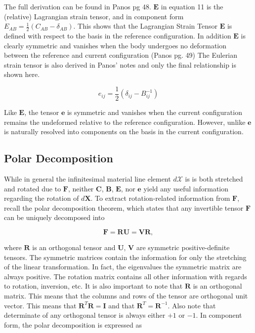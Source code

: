 \documentclass[a4paper]{article}
\begin{document}
The full derivation can be found in Panos pg 48. $\mathbf{E}$ in equation 11 is the (relative) Lagrangian strain tensor, and in component form $E_{AB} = \frac{1}{2} (C_{AB} - \delta_{AB})$. This shows that the Lagrangian Strain Tensor $\mathbf{E}$ is defined with respect to the basis in the reference configuration. In addition $\mathbf{E}$ is clearly symmetric and vanishes when the body undergoes no deformation between the reference and current configuration (Panos pg. 49) 
The Eulerian strain tensor is also derived in Panos' notes and only the final relationship is shown here. 

\begin{equation}
    e_{ij} = \frac{1}{2} (\delta_{ij} - B^{-1}_{ij})
\end{equation}

Like $\mathbf{E}$, the tensor $\mathbf{e}$ is symmetric and vanishes when the current configuration remains the undeformed relative to the reference configuration. However, unlike $\mathbf{e}$ is naturally resolved into components on the basis in the current configuration. 

\subsection{Polar Decomposition}

While in general the infinitesimal material line element $d\mathcal{X}$ is is both stretched and rotated due to $\mathbf{F}$, neither $\mathbf{C}$, $\mathbf{B}$, $\mathbf{E}$, nor $\mathbf{e}$ yield any useful information regarding the rotation of $d\mathbf{X}$. To extract rotation-related information from $\mathbf{F}$, recall the polar decomposition theorem, which states that any invertible tensor $\mathbf{F}$ can be uniquely decomposed into 

\begin{equation}\label{eqn 27}
    \mathbf{F} = \mathbf{R} \mathbf{U} = \mathbf{V} \mathbf{R}, 
\end{equation}

where $\mathbf{R}$ is an orthogonal tensor and $\mathbf{U}$, $\mathbf{V}$ are symmetric positive-definite tensors. The symmetric matrices contain the information for only the stretching of the linear transformation. In fact, the eigenvalues the symmetric matrix are always positive. The rotation matrix contains all other information with regards to rotation, inversion, etc. It is also important to note that $\mathbf{R}$ is an orthogonal matrix. This means that the columns and rows of the tensor are orthogonal unit vector. This means that $\mathbf{R}^T \mathbf{R} = \mathbf{I}$ and that $\mathbf{R}^T = \mathbf{R}^{-1}$. Also note that determinate of any orthogonal tensor is always either $+1$ or $-1$. In component form, the polar decomposition is expressed as 
\end{document}
